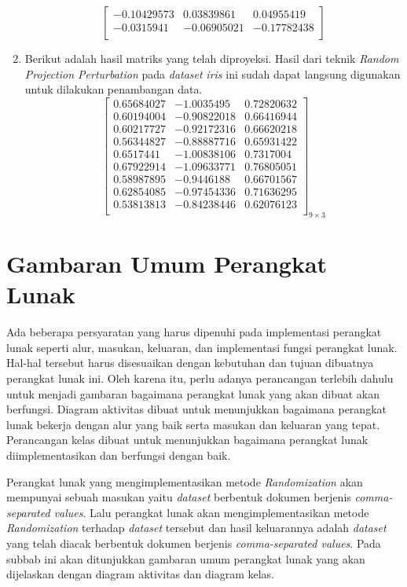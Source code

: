 \begin{enumerate}
\[\begin{bmatrix}
        -0.10429573 &   0.03839861 &   0.04955419 \\
        -0.0315941  &  -0.06905021  & -0.17782438 \\
        \end{bmatrix}
    \]
    \item Berikut adalah hasil matriks yang telah diproyeksi. Hasil dari teknik \textit{Random Projection Perturbation} pada \textit{dataset} \textit{iris} ini sudah dapat langsung digunakan untuk dilakukan penambangan data.
    \[
        \begin{bmatrix}
        0.65684027 &  -1.0035495   &  0.72820632 \\
        0.60194004 &  -0.90822018  &  0.66416944 \\
        0.60217727  & -0.92172316  &  0.66620218 \\
        0.56344827 &  -0.88887716  &  0.65931422 \\
        0.6517441   & -1.00838106  &  0.7317004  \\
        0.67922914  & -1.09633771  &  0.76805051 \\
        0.58987895  & -0.9446188   &  0.66701567 \\
        0.62854085  & -0.97454336  &  0.71636295 \\
        0.53813813  & -0.84238446  &  0.62076123 \\
        \end{bmatrix}_{9\times 3}
    \]
\end{enumerate}

\section{Gambaran Umum Perangkat Lunak}
\label{sec:gambaran-pl}

Ada beberapa persyaratan yang harus dipenuhi pada implementasi perangkat lunak seperti alur, masukan, keluaran, dan implementasi fungsi perangkat lunak. Hal-hal tersebut harus disesuaikan dengan kebutuhan dan tujuan dibuatnya perangkat lunak ini. Oleh karena itu, perlu adanya perancangan terlebih dahulu untuk menjadi gambaran bagaimana perangkat lunak yang akan dibuat akan berfungsi. Diagram aktivitas dibuat untuk menunjukkan bagaimana perangkat lunak bekerja dengan alur yang baik serta masukan dan keluaran yang tepat. Perancangan kelas dibuat untuk menunjukkan bagaimana perangkat lunak diimplementasikan dan berfungsi dengan baik.

Perangkat lunak yang mengimplementasikan metode \textit{Randomization} akan mempunyai sebuah masukan yaitu \textit{dataset} berbentuk dokumen berjenis \textit{comma-separated values}. Lalu perangkat lunak akan mengimplementasikan metode \textit{Randomization} terhadap \textit{dataset} tersebut dan hasil keluarannya adalah \textit{dataset} yang telah diacak berbentuk dokumen berjenis \textit{comma-separated values}. Pada subbab ini akan ditunjukkan gambaran umum perangkat lunak yang akan dijelaskan dengan diagram aktivitas dan diagram kelas.

